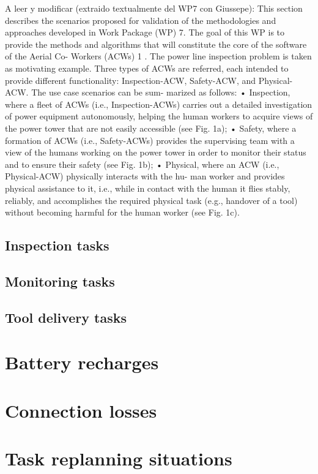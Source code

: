 A leer y modificar (extraido textualmente del WP7 con Giussepe):
This section describes the scenarios proposed for validation of the methodologies and
approaches developed in Work Package (WP) 7. The goal of this WP is to provide the
methods and algorithms that will constitute the core of the software of the Aerial Co-
Workers (ACWs) 1 . The power line inspection problem is taken as motivating example.
Three types of ACWs are referred, each intended to provide different functionality:
Inspection-ACW, Safety-ACW, and Physical-ACW. The use case scenarios can be sum-
marized as follows:
• Inspection, where a fleet of ACWs (i.e., Inspection-ACWs) carries out a detailed
investigation of power equipment autonomously, helping the human workers to
acquire views of the power tower that are not easily accessible (see Fig. 1a);
• Safety, where a formation of ACWs (i.e., Safety-ACWs) provides the supervising
team with a view of the humans working on the power tower in order to monitor
their status and to ensure their safety (see Fig. 1b);
• Physical, where an ACW (i.e., Physical-ACW) physically interacts with the hu-
man worker and provides physical assistance to it, i.e., while in contact with
the human it flies stably, reliably, and accomplishes the required physical task
(e.g., handover of a tool) without becoming harmful for the human worker (see
Fig. 1c).

\subsection{Inspection tasks}
\label{subsec:InspectionTasks}

\subsection{Monitoring tasks}
\label{subsec:MonitoringTasks}

\subsection{Tool delivery tasks}
\label{subsec:ToolDeliveryTasks}


\section{Battery recharges}
\label{sec:BatteryRecharges}

\section{Connection losses}
\label{sec:ConnectionLosses}

\section{Task replanning situations}
\label{sec:TaskReplanningSituations}

